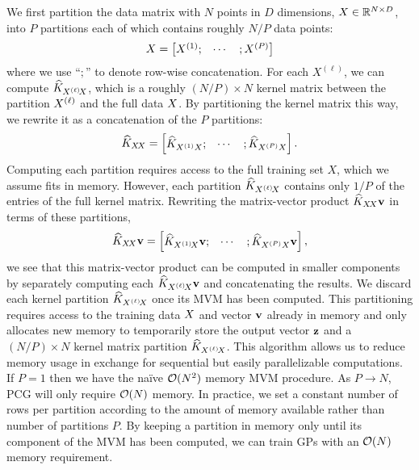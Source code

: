 We first partition the data matrix with $N$ points in $D$ dimensions, $X \in
\mathbb{R}^{N \times D}$, into $P$ partitions each of which contains roughly $N/P$ data points:
%
\[
  X = \begin{bmatrix}
    X^{(1)}; &
    \cdots &
    ; X^{(P)}
  \end{bmatrix}
\]
%
where we use ``$;$'' to denote row-wise concatenation.
For each $X^{(\ell)}$, we can compute $\widehat {K}_{X^{(\ell)}\!X}$, which is a
roughly $(N / P) \times N$ kernel matrix
between the partition $X^{(\ell)}$ and the full data $X$.
By partitioning the kernel matrix this way, we rewrite it as a concatenation of the $P$ partitions:
%
\[
  \widehat {K}_{X\!X} = \begin{bmatrix}
      \widehat {K}_{X^{(1)}X}; &
    \cdots &
    ; \widehat {K}_{X^{(P)}X}
  \end{bmatrix}.
\]
%
Computing each partition requires access to the full training set $X$, which we
assume fits in memory. However, each partition $\widehat {K}_{X^{(\ell)}\!X}$
contains only $1/P$ of the entries of the full kernel matrix.
Rewriting the matrix-vector product $\widehat {K}_{X\!X} \mathbf v$ in terms of these partitions,
%
\[
  \widehat {K}_{X\!X} \mathbf{v} = \begin{bmatrix}
    \widehat {K}_{X^{(1)}\!X} \mathbf{v}; &
    \cdots &
    ; \widehat {K}_{X^{(P)}X} \mathbf{v}
  \end{bmatrix},
\]
%
we see that this matrix-vector product can be computed in smaller components by
separately computing each $\widehat {K}_{X^{(\ell)}\!X} \mathbf{v}$ and concatenating the results. We discard each kernel
partition $\widehat {K}_{X^{(\ell)}\!X}$ once its MVM
has been computed.
This partitioning requires access to the training data $X$ and vector
$\mathbf{v}$ already in memory and only allocates new memory to temporarily store
the output vector $\mathbf{z}$ and a $(N / P) \times N$ kernel matrix partition $
\widehat {K}_{X^{(\ell)}\!X}$.
This algorithm allows us to reduce memory usage in exchange for sequential but easily parallelizable computations.
If $P=1$ then we have the na\"ive $\bigo{N^2}$ memory MVM procedure. As $P \to N$, PCG
will only require $\bigo{N}$ memory. In practice, we set a constant number of rows
per partition according to the amount of memory available
rather than number of partitions $P$.
By keeping a partition in memory only until its component of the MVM has been computed, we can train GPs with an $\bigo{N}$ memory requirement.

